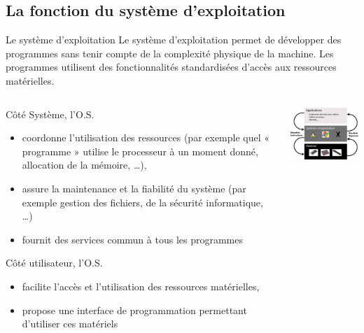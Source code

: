 \subsection{La fonction du système d'exploitation}
\begin{frame}{Le système d'exploitation}
  Le système d'exploitation permet de développer des programmes sans
  tenir compte de la complexité physique de la machine. Les programmes
  utilisent des fonctionnalités standardisées d'accès aux ressources
  matérielles.
  \begin{columns}
    \begin{column}{5.5cm}
      \begin{block}{Côté Système, l'O.S.}
        \begin{itemize}
        \item coordonne l'utilisation des ressources (par exemple quel «
          programme » utilise le processeur à un moment donné,
          allocation de la mémoire, \dots),
        \item assure la maintenance et la fiabilité du système (par exemple
          gestion des fichiers, de la sécurité informatique, \dots)
        \item fournit des services commun à tous les programmes
        \end{itemize}
      \end{block}
      \begin{block}{Côté utilisateur, l'O.S.}
        \begin{itemize}
        \item facilite l'accès et l'utilisation des ressources
          matérielles,
        \item propose une interface de programmation permettant
          d'utiliser ces matériels
        \end{itemize}
      \end{block}
    \end{column}
    \begin{column}{6cm}
      \begin{center}
        \includegraphics[width=6cm]{img/s01/OS_interface_2.jpg}
      \end{center}
    \end{column}
  \end{columns}
\end{frame}


